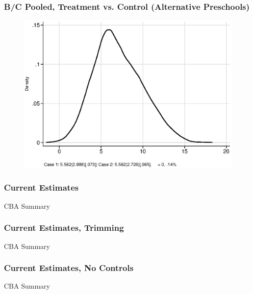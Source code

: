 \documentclass[static]{JJH-Beamer}
\begin{document}
\begin{frame}
\frametitle{B/C Pooled, Treatment vs. Control (Alternative Preschools)} 
\begin{figure}
	\includegraphics[width=.8\columnwidth]{output/ratios_8_sexp.eps}
\end{figure}
\end{frame}


\begin{frame}
\frametitle{Current Estimates}
\begin{center}
\begin{table}
	\caption{CBA Summary}
	\scalebox{.60}{}
\end{table}
\end{center}
\end{frame}


\begin{frame}
\frametitle{Current Estimates, Trimming}
\begin{center}
\begin{table}
	\caption{CBA Summary}
	\scalebox{.60}{}
\end{table}
\end{center}
\end{frame}


\begin{frame}
\frametitle{Current Estimates, No Controls}
\begin{center}
\begin{table}
	\caption{CBA Summary}
	\scalebox{.60}{}
\end{table}
\end{center}
\end{frame}
\end{document}
